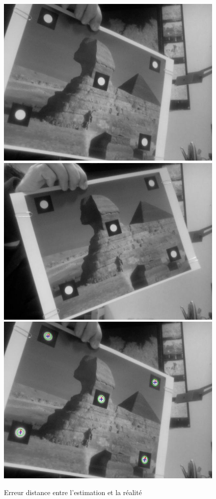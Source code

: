 \documentclass[12pt]{report}
\begin{document}
\begin{figure}
\begin{center}
\includegraphics[scale=0.3]{Images/I1.jpg}
\includegraphics[scale=0.3]{Images/I2.jpg}
\includegraphics[scale=0.3]{Images/result_tp3.jpg}
\caption{Erreur distance entre l'estimation et la réalité}
\end{center}
\end{figure}
\end{document}
